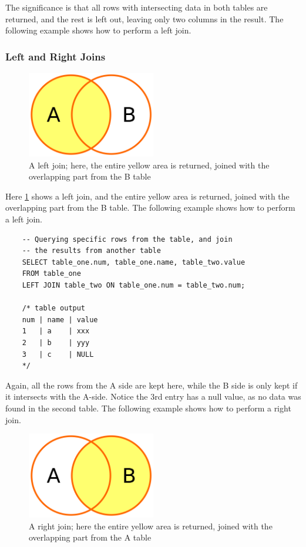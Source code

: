 The significance is that all rows with intersecting data in both tables are returned, and the rest is left out, leaving only two columns in the result. The following example shows how to perform a left join.

\subsubsection{Left and Right Joins}

\begin{figure}[H]
    \centering
    \includegraphics[width=0.5\textwidth]{content/1-relational-databases/figures/joins/leftjoin.png}
    \caption{A left join; here, the entire yellow area is returned, joined with the overlapping part from the B table}
    \label{fig:1.leftjoin}
\end{figure}

Here \cref{fig:1.leftjoin} shows a left join, and the entire yellow area is returned, joined with the overlapping part from the B table. The following example shows how to perform a left join.

\begin{verbatim}
    -- Querying specific rows from the table, and join 
    -- the results from another table
    SELECT table_one.num, table_one.name, table_two.value
    FROM table_one
    LEFT JOIN table_two ON table_one.num = table_two.num;

    /* table output
    num | name | value
    1   | a    | xxx
    2   | b    | yyy
    3   | c    | NULL
    */
\end{verbatim}

Again, all the rows from the A side are kept here, while the B side is only kept if it intersects with the A-side. Notice the 3rd entry has a null value, as no data was found in the second table. The following example shows how to perform a right join.


\begin{figure}[H]
    \centering
    \includegraphics[width=0.5\textwidth]{content/1-relational-databases/figures/joins/rightjoin.png}
    \caption{A right join; here the entire yellow area is returned, joined with the overlapping part from the A table}
    \label{fig:1.rightjoin}
\end{figure}

